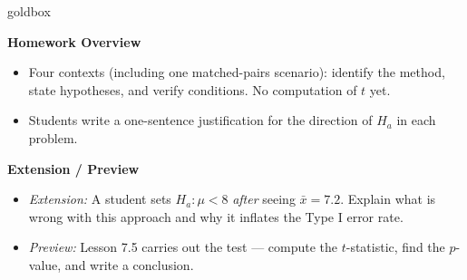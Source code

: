 \documentclass[10pt]{article}
\begin{document}
\begin{skillbox}{goldbox}
\begin{minipage}[t]{0.48\linewidth}
    \textbf{Homework Overview}
    \begin{itemize}
        \item Four contexts (including one matched-pairs scenario): identify the method,
              state hypotheses, and verify conditions. No computation of $t$ yet.
        \item Students write a one-sentence justification for the direction of $H_a$
              in each problem.
    \end{itemize}
\end{minipage}
\hfill
\begin{minipage}[t]{0.48\linewidth}
    \textbf{Extension / Preview}
    \begin{itemize}
        \item \textit{Extension:} A student sets $H_a: \mu < 8$ \emph{after} seeing
              $\bar x = 7.2$. Explain what is wrong with this approach and why it inflates
              the Type I error rate.
        \item \textit{Preview:} Lesson 7.5 carries out the test --- compute the
              $t$-statistic, find the $p$-value, and write a conclusion.
    \end{itemize}
\end{minipage}
\end{skillbox}
\end{document}
